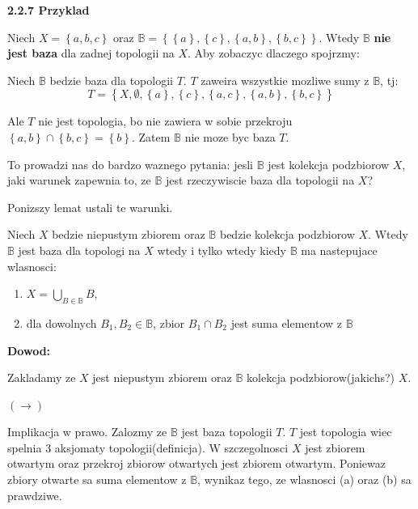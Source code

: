 \documentclass{article}
\begin{document}
\textbf{2.2.7 Przyklad}

Niech $X = \left\{ a,b,c \right\}$ oraz $\mathbb{B} = \left\{ \left\{ a \right\}, \left\{ c \right\}, \left\{ a,b \right\}, \left\{ b,c \right\}  \right\}$. Wtedy $\mathbb{B}$ \textbf{nie jest baza} dla zadnej topologii na $X$. Aby zobaczyc dlaczego spojrzmy:

Niech $\mathbb{B}$ bedzie baza dla topologii $T$. $T$ zaweira wszystkie mozliwe sumy z $\mathbb{B}$, tj:
$$T = \left\{X, \emptyset, \left\{ a \right\}, \left\{ c \right\}, \left\{ a,c \right\}, \left\{ a,b \right\}, \left\{ b,c \right\}    \right\}$$

Ale $T$ nie jest topologia, bo nie zawiera w sobie przekroju $\left\{ a,b \right\} \cap \left\{ b,c \right\} = \left\{ b \right\}$. Zatem $\mathbb{B}$ nie moze byc baza $T$.
\vspace{1cm}

To prowadzi nas do bardzo waznego pytania: jesli $\mathbb{B}$ jest kolekcja podzbiorow $X$, jaki warunek zapewnia to, ze $\mathbb{B}$ jest rzeczywiscie baza dla topologii na $X$?

Ponizszy lemat ustali te warunki.

\begin{tcolorbox}[colback=white!90!green,colframe=black!35!green,title=2.2.8 Lemat: Warunek na bycie baza]

    Niech $X$ bedzie niepustym zbiorem oraz $\mathbb{B}$ bedzie kolekcja podzbiorow $X$. Wtedy $\mathbb{B}$ jest baza dla topologi na $X$ wtedy i tylko wtedy kiedy $\mathbb{B}$ ma nastepujace wlasnosci:

    \begin{enumerate}[label=(\alph*)]
        \item $X = \bigcup\limits_{B \in \mathbb{B}}B$,
        \item dla dowolnych $B_{1}, B_{2} \in \mathbb{B}$, zbior $B_{1} \cap B_{2}$ jest suma elementow z $\mathbb{B}$
        
    \end{enumerate}

\end{tcolorbox}

\textbf{Dowod:}

Zakladamy ze $X$ jest niepustym zbiorem oraz $\mathbb{B}$ kolekcja podzbiorow(jakichs?) $X$.

$(\rightarrow)$

Implikacja w prawo. Zalozmy ze $\mathbb{B}$ jest baza topologii $T$. $T$ jest topologia wiec spelnia 3 aksjomaty topologii(definicja). W szczegolnosci $X$ jest zbiorem otwartym oraz przekroj zbiorow otwartych jest zbiorem otwartym. Poniewaz zbiory otwarte sa suma elementow z $\mathbb{B}$, wynikaz tego, ze wlasnosci (a) oraz (b) sa prawdziwe.
\end{document}
